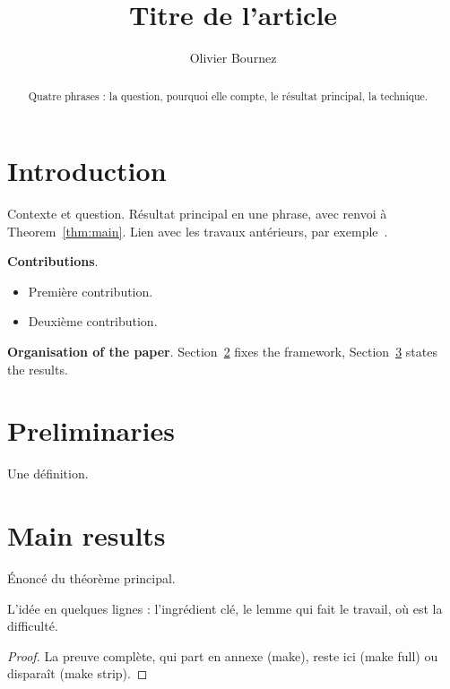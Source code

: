 \documentclass[a4paper,USenglish]{lipics-v2021}
\title{Titre de l'article}
\author{Olivier Bournez}{Institut Polytechnique de Paris, Ecole Polytechnique, LIX, Palaiseau, France}{bournez@lix.polytechnique.fr}{0000-0002-9218-1130}{ANR Project OTC}
\newcommand\myparagraph[1]{\medskip\noindent\textbf{#1}.}
\begin{document}
\maketitle

\begin{abstract}
Quatre phrases : la question, pourquoi elle compte, le résultat principal, la technique.
\end{abstract}

\section{Introduction}
\label{sec:intro}

Contexte et question. Résultat principal en une phrase, avec renvoi à
Theorem~\ref{thm:main}. Lien avec les travaux antérieurs, par exemple~\cite{JournalACM2017}.

\myparagraph{Contributions}
\begin{itemize}
\item Première contribution.
\item Deuxième contribution.
\end{itemize}

\myparagraph{Organisation of the paper}
Section~\ref{sec:prelim} fixes the framework, Section~\ref{sec:results} states the results.

\section{Preliminaries}
\label{sec:prelim}

\begin{definition}[Notion]
\label{def:notion}
Une définition.
\end{definition}

\section{Main results}
\label{sec:results}

\begin{theoremrep}
\label{thm:main}
Énoncé du théorème principal.
\end{theoremrep}
\begin{proofsketch}
L'idée en quelques lignes : l'ingrédient clé, le lemme qui fait le travail, où est la difficulté.
\end{proofsketch}
\begin{proof}
La preuve complète, qui part en annexe (make), reste ici (make full) ou disparaît (make strip).
\end{proof}
\end{document}
